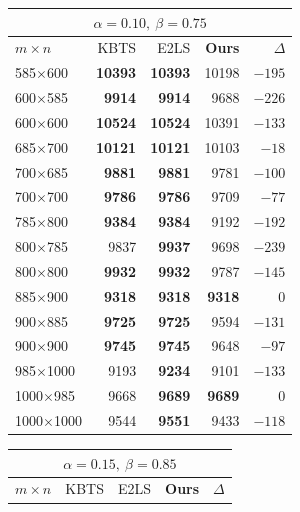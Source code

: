 \documentclass[12pt,preprintnumbers,amsmath,amssymb,nofootinbib,superscriptaddress]{revtex4-1}
\begin{document}
{\centering\scriptsize\setlength{\tabcolsep}{4pt}
\begin{tabular}{lrrrr}
\hline\hline
\multicolumn{5}{c}{$\alpha=0.10,\ \beta=0.75$}\\
\hline
$m\times n$ & KBTS & E2LS & \textbf{Ours} & $\Delta$\\
\hline
585$\times$600 & \textbf{10393} & \textbf{10393} & \textcolor{Red!80!black}{10198} & $-195$\\
600$\times$585 & \textbf{9914} & \textbf{9914} & \textcolor{Red!80!black}{9688} & $-226$\\
600$\times$600 & \textbf{10524} & \textbf{10524} & \textcolor{Red!80!black}{10391} & $-133$\\
685$\times$700 & \textbf{10121} & \textbf{10121} & \textcolor{Red!80!black}{10103} & $-18$\\
700$\times$685 & \textbf{9881} & \textbf{9881} & \textcolor{Red!80!black}{9781} & $-100$\\
700$\times$700 & \textbf{9786} & \textbf{9786} & \textcolor{Red!80!black}{9709} & $-77$\\
785$\times$800 & \textbf{9384} & \textbf{9384} & \textcolor{Red!80!black}{9192} & $-192$\\
800$\times$785 & 9837 & \textbf{9937} & \textcolor{Red!80!black}{9698} & $-239$\\
800$\times$800 & \textbf{9932} & \textbf{9932} & \textcolor{Red!80!black}{9787} & $-145$\\
885$\times$900 & \textbf{9318} & \textbf{9318} & \textbf{9318} & 0\\
900$\times$885 & \textbf{9725} & \textbf{9725} & \textcolor{Red!80!black}{9594} & $-131$\\
900$\times$900 & \textbf{9745} & \textbf{9745} & \textcolor{Red!80!black}{9648} & $-97$\\
985$\times$1000 & 9193 & \textbf{9234} & \textcolor{Red!80!black}{9101} & $-133$\\
1000$\times$985 & 9668 & \textbf{9689} & \textbf{9689} & 0\\
1000$\times$1000 & 9544 & \textbf{9551} & \textcolor{Red!80!black}{9433} & $-118$\\
\hline\hline
\end{tabular}
\hspace{2.5cm}
\begin{tabular}{lrrrr}
\hline\hline
\multicolumn{5}{c}{$\alpha=0.15,\ \beta=0.85$}\\
\hline
$m\times n$ & KBTS & E2LS & \textbf{Ours} & $\Delta$\\

\end{tabular}}
\end{document}
